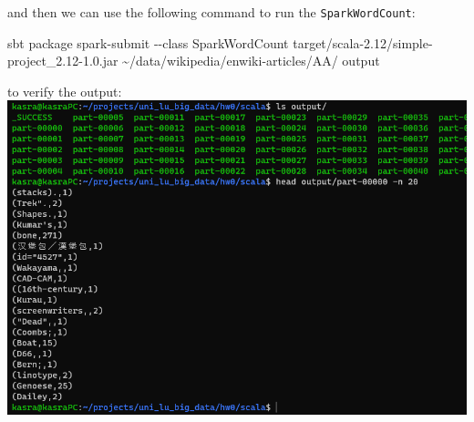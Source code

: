 \documentclass[
]{article}
\newenvironment{Shaded}{}{}
\newcommand{\ExtensionTok}[1]{#1}
\newcommand{\NormalTok}[1]{#1}
\begin{document}
and then we can use the following command to run the
\texttt{SparkWordCount}:

\begin{Shaded}
\begin{Highlighting}[]
\ExtensionTok{sbt}\NormalTok{ package}
\ExtensionTok{spark{-}submit}\NormalTok{ {-}{-}class SparkWordCount target/scala{-}2.12/simple{-}project\_2.12{-}1.0.jar \textasciitilde{}/data/wikipedia/enwiki{-}articles/AA/ output}
\end{Highlighting}
\end{Shaded}

to verify the output:\\
\includegraphics{image-11.png}
\end{document}
